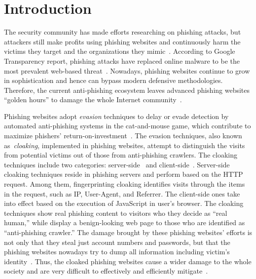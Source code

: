 \section{Introduction}

The security community has made efforts researching on phishing attacks,
but attackers still make profits using phishing websites and continuously harm the victims they target and the organizations they mimic~\cite{ho2019detecting, van2019cognitive}.
According to Google Transparency report, phishing attacks have replaced online malware to be the most prevalent web-based threat~\cite{googletransparencyreport, solutions2019verizon}.
Nowadays, phishing websites continue to grow in sophistication and hence can bypass modern defensive methodologies.
Therefore, the current anti-phishing ecosystem leaves advanced phishing websites ``golden hours'' to damage the whole Internet community~\cite{oest2020sunrise}.

Phishing websites adopt \emph{evasion} techniques to delay or evade detection by automated anti-phishing systems in the cat-and-mouse game,
which contribute to maximize phishers' return-on-investment~\cite{thomas2017data}.
The evasion techniques, also known as~\emph{cloaking}, implemented in phishing websites, attempt to distinguish the visits from potential victims out of those from anti-phishing crawlers.
The cloaking techniques include two categories: server-side~\cite{oest2018inside} and client-side~\cite{zhang2021crawlphish}.
Server-side cloaking techniques reside in phishing servers and perform based on the HTTP request. 
Among them, fingerprinting cloaking identifies visits through the items in the request, such as IP, User-Agent, and Referrer.
The client-side ones take into effect based on the execution of JavaScript in user's browser.
The cloaking techniques show real phishing content to visitors who they decide as ``real human,'' while display a benign-looking web page to those who are identified as ``anti-phishing crawler.''
The damage brought by these phishing websites' efforts is not only that they steal just account numbers and passwords,
but that the phishing websites nowadays try to dump all information including victim's identity~\cite{thomas2017data}.
Thus, the cloaked phishing websites cause a wider damage to the whole society and are very difficult to effectively and efficiently mitigate~\cite{oest2020sunrise, zhang2021crawlphish}.

